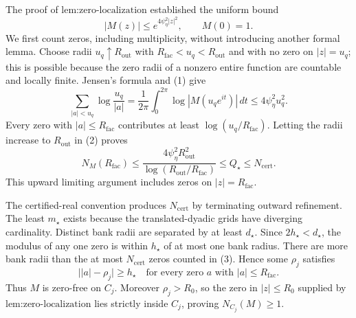 The proof of \(\text{lem:zero-localization}\) established the uniform bound
\[
 |M(z)|\le e^{4\psi_{\eta}^2|z|^2},\qquad M(0)=1. \tag{1}
\]
We first count zeros, including multiplicity, without introducing another formal lemma.  Choose radii \(u_q\uparrow R_{\mathrm{out}}\) with \(R_{\mathrm{fac}}<u_q<R_{\mathrm{out}}\) and with no zero on \(|z|=u_q\); this is possible because the zero radii of a nonzero entire function are countable and locally finite.  Jensen's formula and (1) give
\[
 \sum_{|a|<u_q}\log\frac{u_q}{|a|}
 =\frac1{2\pi}\int_0^{2\pi}\log|M(u_qe^{it})|\,dt
 \le4\psi_{\eta}^2u_q^2. \tag{2}
\]
Every zero with \(|a|\le R_{\mathrm{fac}}\) contributes at least \(\log(u_q/R_{\mathrm{fac}})\).  Letting the radii increase to \(R_{\mathrm{out}}\) in (2) proves
\[
 N_M(R_{\mathrm{fac}})
 \le
 \frac{4\psi_{\eta}^2R_{\mathrm{out}}^2}
      {\log(R_{\mathrm{out}}/R_{\mathrm{fac}})}
 \le Q_{\star}\le N_{\mathrm{cert}}. \tag{3}
\]
This upward limiting argument includes zeros on \(|z|=R_{\mathrm{fac}}\).

The certified-real convention produces \(N_{\mathrm{cert}}\) by terminating outward refinement.  The least \(m_{\star}\) exists because the translated-dyadic grids have diverging cardinality.  Distinct bank radii are separated by at least \(d_{\star}\).  Since \(2h_{\star}<d_{\star}\), the modulus of any one zero is within \(h_{\star}\) of at most one bank radius.  There are more bank radii than the at most \(N_{\mathrm{cert}}\) zeros counted in (3).  Hence some \(\rho_j\) satisfies
\[
 \bigl||a|-\rho_j\bigr|\ge h_{\star}
 \quad\text{for every zero }a\text{ with }|a|\le R_{\mathrm{fac}}. \tag{4}
\]
Thus \(M\) is zero-free on \(C_j\).  Moreover \(\rho_j>R_0\), so the zero in \(|z|\le R_0\) supplied by \(\text{lem:zero-localization}\) lies strictly inside \(C_j\), proving \(N_{C_j}(M)\ge1\).


